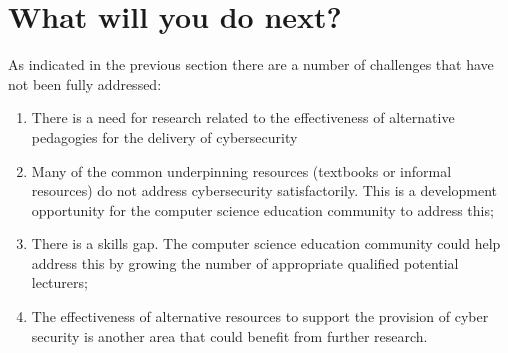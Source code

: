\documentclass[sigconf]{acmart}
\begin{document}
\begin{comment}


Within the computer science education research community there is a growing appreciate for the need to enhance underpinning resources for example \cite{Drop2019}. Also educational cybersecurity is an increasing common theme at education research conferences.


\end{comment}

\begin{comment}

The ACM/IEEE-CS Joint Task Force on Computing Curricula~\cite[p.~97]{ACM2013a} takes a distinct view on the Knowledge Areas (KAs):

\begin{quote}
	``{\emph{The Information Assurance and Security KA is unique among the set of KAs presented here
			given the manner in which the topics are pervasive throughout other KAs.}}''
\end{quote}

It proposes nine ``core'' hours and 63.5 distributed across the other KAs. Nevertheless, the situation on the ground in the USA is different~\cite{Ackerman2019a}:

\begin{quote}
	``{\emph{Universities suffer shortcomings, as well. Roughly 85 of them offer undergraduate and/or graduate degrees in cybersecurity. There is a big catch, however. Far more diversified computer science programs, which attract substantially more students, don't mandate even one cybersecurity course.}}''
\end{quote}

\end{comment}



\section {What will you do next?}	
As indicated in the previous section there are a number of challenges
that have not been fully addressed:

\begin{enumerate}
	\item There is a need for research related to the effectiveness of alternative pedagogies for the delivery of cybersecurity
	\item Many of the common underpinning resources (textbooks or informal resources) do not address cybersecurity satisfactorily. This is a development opportunity for the computer science education community to address this;
	\item There is a skills gap. The computer science education community could help address this by growing the number of appropriate qualified potential lecturers;
	\item The effectiveness of alternative resources to support the provision of cyber security is another area that could benefit from further research.
\end{enumerate}
\end{document}
